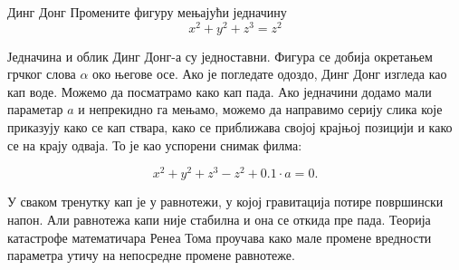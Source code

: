 \begin{surferPage}{Динг Донг}
Промените фигуру мењајући једначину\\

\smallskip
\[x^2	+ y^2	+ z^3	= z^2\]

\singlespacing
Једначина и облик Динг Донг-а су једноставни. Фигура се добија окретањем грчког слова $\alpha$ око његове осе. Ако је погледате одоздо, Динг Донг изгледа као кап воде. Можемо да посматрамо како кап пада.
\newline
Ако једначини додамо мали параметар $a$ и непрекидно га мењамо, можемо да направимо серију слика које приказују како се кап ствара, како се приближава својој крајњој позицији и како се на крају одваја. То је као успорени снимак филма:

\[x^2	+ y^2	+ z^3	-z^2+0.1\cdot a=0.\]

У сваком тренутку кап је у равнотежи, у којој гравитација потире површински напон. Али равнотежа капи није стабилна и она се откида пре пада. Теорија катастрофе математичара Ренеа Тома проучава како мале промене вредности параметра утичу на непосредне промене равнотеже.
\end{surferPage}
